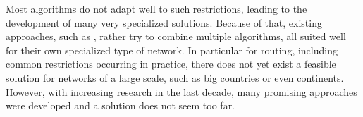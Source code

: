 	Most algorithms do not adapt well to such restrictions, leading to the development of many very specialized solutions. Because of that, existing
	approaches, such as \anr, rather try to combine multiple algorithms, all suited well for their own specialized type of network. In particular
	for \multiModal routing, including common restrictions occurring in practice, there does not yet exist a feasible solution for networks of a large scale,
	such as big countries or even continents. However, with increasing research in the last decade, many promising approaches were developed and
	a solution does not seem too far.